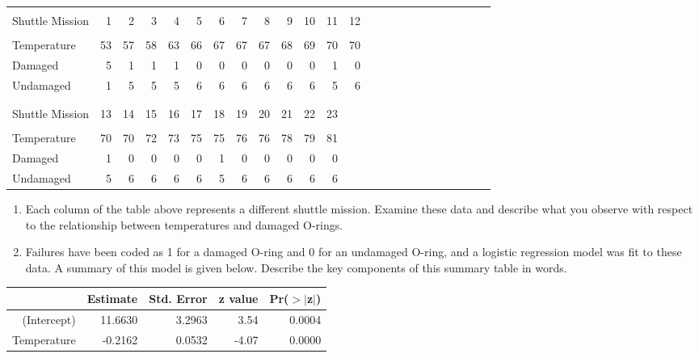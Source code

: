 \documentclass[
]{article}
\providecommand{\tightlist}{%
  \setlength{\itemsep}{0pt}\setlength{\parskip}{0pt}}
\begin{document}
\begin{center}
\begin{tabular}{l rrrrr rrrrr rrrrr rrrrr rrr}
\hline
\vspace{-3.1mm} \\
Shuttle Mission   & 1  & 2 & 3 & 4 & 5 & 6 & 7 & 8 & 9 & 10 & 11 & 12 \\
\hline
\vspace{-3.1mm} \\
Temperature       & 53 & 57 & 58 & 63 & 66 & 67 & 67 & 67 & 68 & 69 & 70 & 70  \\
Damaged           & 5  & 1 & 1 & 1 & 0 & 0 & 0 & 0 & 0 & 0 & 1 & 0 \\
Undamaged         & 1  & 5 & 5 & 5 & 6 & 6 & 6 & 6 & 6 & 6 & 5 & 6 \\
\hline
\\ 
\cline{1-12}
\vspace{-3.1mm} \\
Shuttle Mission   & 13 & 14 & 15 & 16 & 17 & 18 & 19 & 20 & 21 & 22 & 23 \\
\cline{1-12}
\vspace{-3.1mm} \\
Temperature       & 70 & 70 & 72 & 73 & 75 & 75 & 76 & 76 & 78 & 79 & 81 \\
Damaged           & 1  & 0 & 0 & 0 & 0 & 1 & 0 & 0 & 0 & 0 & 0 \\
Undamaged         & 5  & 6 & 6 & 6 & 6 & 5 & 6 & 6 & 6 & 6 & 6 \\
\cline{1-12}
\end{tabular}
\end{center}

\begin{enumerate}
\def\labelenumi{(\alph{enumi})}
\tightlist
\item
  Each column of the table above represents a different shuttle mission.
  Examine these data and describe what you observe with respect to the
  relationship between temperatures and damaged O-rings.
\item
  Failures have been coded as 1 for a damaged O-ring and 0 for an
  undamaged O-ring, and a logistic regression model was fit to these
  data. A summary of this model is given below. Describe the key
  components of this summary table in words.
\end{enumerate}

\begin{center}
\begin{tabular}{rrrrr}
  \hline
            & Estimate & Std. Error & z value   & Pr($>$$|$z$|$) \\ 
  \hline
(Intercept) & 11.6630  & 3.2963     & 3.54      & 0.0004 \\ 
Temperature & -0.2162  & 0.0532     & -4.07     & 0.0000 \\ 
  \hline
\end{tabular}
\end{center}
\end{document}
